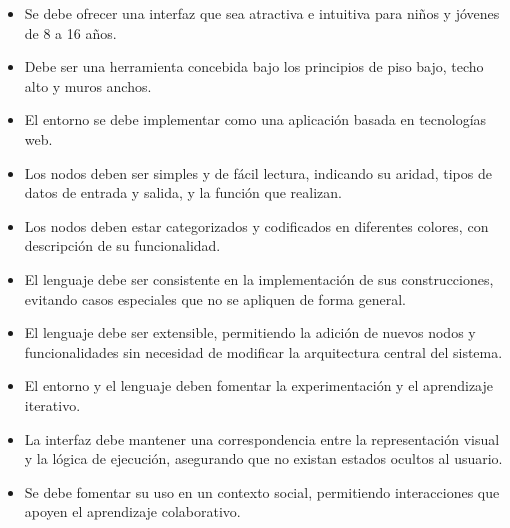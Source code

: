 
\begin{itemize}
  \item Se debe ofrecer una interfaz que sea atractiva e intuitiva para niños y jóvenes de 8 a 16 años.
  \item Debe ser una herramienta concebida bajo los principios de piso bajo, techo alto y muros anchos.
  \item El entorno se debe implementar como una aplicación basada en tecnologías web.
  \item Los nodos deben ser simples y de fácil lectura, indicando su aridad, tipos de datos de entrada y salida, y la función que realizan.
  \item Los nodos deben estar categorizados y codificados en diferentes colores, con descripción de su funcionalidad.
  \item El lenguaje debe ser consistente en la implementación de sus construcciones, evitando casos especiales que no se apliquen de forma general.
  \item El lenguaje debe ser extensible, permitiendo la adición de nuevos nodos y funcionalidades sin necesidad de modificar la arquitectura central del sistema.
  \item El entorno y el lenguaje deben fomentar la experimentación y el aprendizaje iterativo.
  \item La interfaz debe mantener una correspondencia entre la representación visual y la lógica de ejecución, asegurando que no existan estados ocultos al usuario.
  \item Se debe fomentar su uso en un contexto social, permitiendo interacciones que apoyen el aprendizaje colaborativo.
\end{itemize}
